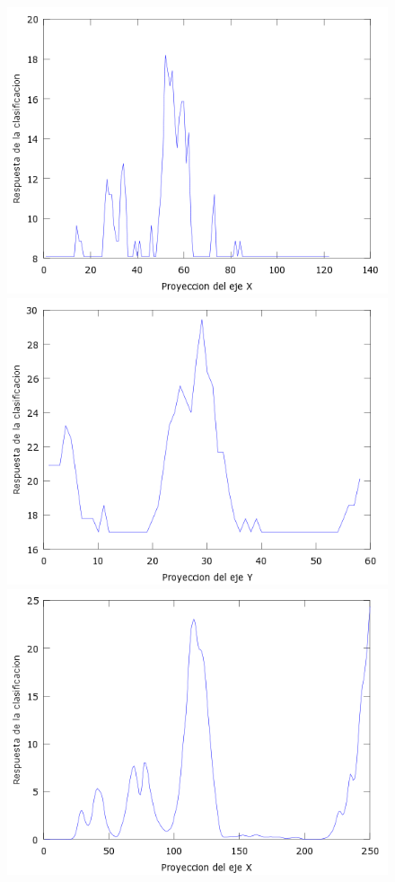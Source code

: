 \begin{figure}[htc]
  \centering
  \includegraphics[scale=.4]{images/plots/boost2X}
  \includegraphics[scale=.4]{images/plots/boost2Y}
  \includegraphics[scale=.4]{images/plots/svm2X}

\end{figure}
